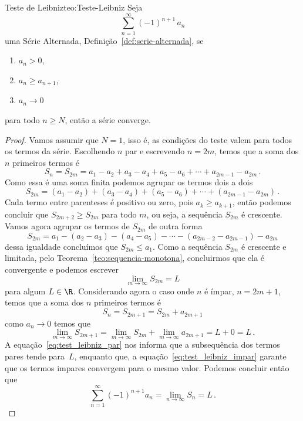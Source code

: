 \begin{teorema}{Teste de Leibniz}{teo:Teste-Leibniz}
  Seja
  \[
    \sum_{n=1}^\infty (-1)^{n+1}\,a_n
  \]
  uma Série Alternada, Definição~\ref{def:serie-alternada}, se
  \begin{enumerate}
      \item $a_n>0$,
      \item $a_n\geq a_{n+1}$,
      \item $a_n\to 0$
  \end{enumerate}
  para todo $n \geq N$, então a série converge.
\end{teorema}
\begin{proof}
Vamos assumir que $N=1$, isso é, as condições do teste valem para todos os
termos da série. Escolhendo $n$ par e escrevendo $n=2m$, temos que
a soma dos $n$ primeiros termos é
\[
  S_n = S_{2m} = a_1 - a_2 + a_3 - a_4 + a_5 - a_6 + \cdots + a_{2m-1} - a_{2m}    \,.
\]
Como essa é uma soma finita podemos agrupar os termos dois a dois
\[
  S_{2m} = (a_1 - a_2) + (a_3 - a_4) + (a_5 - a_6) + \cdots + (a_{2m-1} - a_{2m})    \,.
\]
Cada termo entre parenteses é positivo ou zero, pois $a_k\geq a_{k+1}$,
então podemos concluir que $S_{2m+2}\geq S_{2m}$ para todo $m$, ou seja,
a sequência $S_{2m}$ é crescente.
Vamos agora agrupar os termos de $S_{2m}$ de outra forma
\[
  S_{2m} = a_1 - (a_2 - a_3) - (a_4 - a_5) - \cdots -  (a_{2m-2} - a_{2m-1}) - a_{2m}
\]
dessa igualdade concluímos que
\(
  S_{2m} \leq a_1
\).
Como a sequência $S_{2m}$ é crescente e limitada, pelo Teorema~\ref{teo:sequencia-monotona},
concluirmos que ela é convergente e podemos escrever
\begin{equation}
  \label{eq:test_leibniz_par}
  \lim_{m\to \infty} S_{2m} = L
\end{equation}
para algum $L\in\R$.
Considerando agora o caso onde $n$ é ímpar, $n=2m+1$, temos que a soma dos $n$
primeiros termos é
\[
  S_n = S_{2m+1} = S_{2m} + a_{2m+1}
\]
como $a_n\to 0$ temos que
\begin{equation}
  \label{eq:test_leibniz_impar}
  \lim_{m\to \infty} S_{2m+1}
  = \lim_{m\to \infty} S_{2m} + \lim_{m\to \infty} a_{2m+1}
  = L + 0 = L   \,.
\end{equation}
A equação~\eqref{eq:test_leibniz_par} nos informa que a subsequência dos termos pares
tende para~$L$, enquanto que, a equação~\eqref{eq:test_leibniz_impar} garante que os
termos impares convergem para o mesmo valor. Podemos concluir então que
\[
  \sum_{n=1}^\infty (-1)^{n+1}a_n
  = \lim_{n\to \infty} S_n
  = L    \,.
\]
\end{proof}

